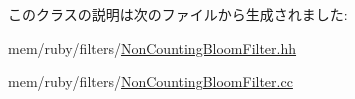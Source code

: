 このクラスの説明は次のファイルから生成されました:\begin{DoxyCompactItemize}
\item 
mem/ruby/filters/\hyperlink{NonCountingBloomFilter_8hh}{NonCountingBloomFilter.hh}\item 
mem/ruby/filters/\hyperlink{NonCountingBloomFilter_8cc}{NonCountingBloomFilter.cc}\end{DoxyCompactItemize}
